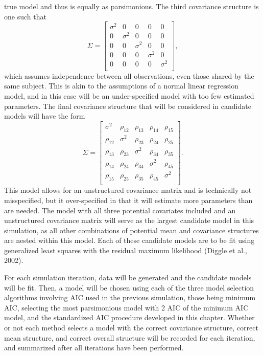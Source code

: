 		true model and thus is equally as parsimonious. The third covariance structure is one such that 
				\begin{equation}
			\Sigma = 
			\begin{bmatrix}
				\sigma^2 & 0 & 0 & 0 & 0 \\
				0 & \sigma^2 & 0 & 0 & 0 \\
				0 & 0 & \sigma^2 & 0 & 0 \\
				0 & 0 & 0 & \sigma^2 & 0 \\
				0 & 0 & 0 & 0 & \sigma^2 \\
			\end{bmatrix}
			,
		\end{equation}
		which assumes independence between all observations, even those shared by the same subject. This is akin to the assumptions of a normal linear regression model, and in this case will be
		an under-specified model with too few estimated parameters. The final covariance structure that will be considered in candidate models will have the form
		\begin{equation}
			\Sigma = 
			\begin{bmatrix}
				\sigma^2 & \rho_{12} & \rho_{13} & \rho_{14} & \rho_{15} \\
				\rho_{12} & \sigma^2 & \rho_{23} & \rho_{24} & \rho_{25} \\
				\rho_{13} & \rho_{23} & \sigma^2 & \rho_{34} & \rho_{35} \\
				\rho_{14} & \rho_{24} & \rho_{34} & \sigma^2 & \rho_{45} \\
				\rho_{15} & \rho_{25} & \rho_{35} & \rho_{45} & \sigma^2 \\
			\end{bmatrix}
			.
		\end{equation}
		This model allows for an unstructured covariance matrix and is technically not misspecified, but it over-specified in that it will estimate more parameters than are needed. The model
		with all three potential covariates included and an unstructured covariance matrix will serve as the largest candidate model in this simulation, as all other combinations of potential
		mean and covariance structures are nested within this model. Each of these candidate models are to be fit using generalized least squares with the residual maximum likelihood (Diggle et al., 2002).

		For each simulation iteration, data will be generated and the candidate models will be fit. Then, a model will be chosen using each of the three model selection algorithms involving
		AIC used in the previous simulation, those being minimum AIC, selecting the most parsimonious model with 2 AIC of the minimum AIC model, and the standardized AIC procedure developed in this
		chapter. Whether or not each method selects a model with the correct covariance structure, correct mean structure, and correct overall structure will be recorded for each iteration, and
		summarized after all iterations have been performed.

